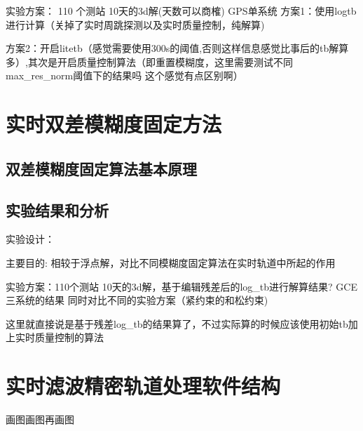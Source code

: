 实验方案： 110 个测站 10天的3d解(天数可以商榷) GPS单系统
方案1：使用log\underline{\space}tb进行计算（关掉了实时周跳探测以及实时质量控制，纯解算)

方案2：开启litetb（感觉需要使用300s的阈值,否则这样信息感觉比事后的tb解算多）,其次是开启质量控制算法（即重置模糊度，这里需要测试不同max\_res\_norm阈值下的结果吗 这个感觉有点区别啊）

\section{实时双差模糊度固定方法}

\subsection{双差模糊度固定算法基本原理}

\subsection{实验结果和分析}

实验设计：

主要目的:
相较于浮点解，对比不同模糊度固定算法在实时轨道中所起的作用

实验方案：110个测站  10天的3d解，基于编辑残差后的log\_tb进行解算结果? GCE三系统的结果
同时对比不同的实验方案（紧约束的和松约束)

这里就直接说是基于残差log\_tb的结果算了，不过实际算的时候应该使用初始tb加上实时质量控制的算法

\section{实时滤波精密轨道处理软件结构}

画图画图再画图
